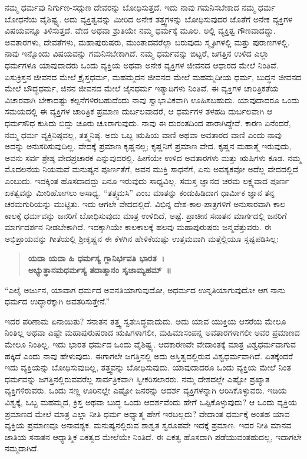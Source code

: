 ನಮ್ಮ ಧರ್ಮವು ನಿರ್ಗುಣ-ಸದ್ಗುಣ ದೇವರನ್ನು ಬೋಧಿಸುತ್ತದೆ. ಇದು ನಾವು ಗಮನಿಸಬೇಕಾದ ನಮ್ಮ ಧರ್ಮ ಬೋಧನೆಯ ವೈಶಿಷ್ಟ್ಯ. ಅದು ವ್ಯಕ್ತಿತ್ವವನ್ನು ಮೀರಿದ ಅನೇಕ ತತ್ತ್ವಗಳನ್ನು ಬೋಧಿಸುವುದರ ಜೊತೆಗೆ ಅನೇಕ ವ್ಯಕ್ತಿಗಳ ವಿಷಯವನ್ನೂ ತಿಳಿಸುತ್ತದೆ. ವೇದ ಅಥವಾ ಶ್ರುತಿಯೇ ನಮ್ಮ ಧರ್ಮಕ್ಕೆ ಮೂಲ. ಅಲ್ಲಿ ವ್ಯಕ್ತಿತ್ವ ಗೌಣವಾದದ್ದು. ಅವತಾರಗಳು, ದೇವತೆಗಳು, ಮಹಾಪುರುಷರು, ಮುಂತಾದವರೆಲ್ಲಾ ಬರುವುದು ಸ್ಮೃತಿಗಳಲ್ಲಿ ಮತ್ತು ಪುರಾಣಗಳಲ್ಲಿ. ನಾವು ಇನ್ನೊಂದು ವಿಷಯವನ್ನು ಗಮನಿಸಬೇಕಾಗಿದೆ. ನಮ್ಮ ಧರ್ಮವನ್ನು ಬಿಟ್ಟರೆ, ಜಗತ್ತಿನ ಉಳಿದ ಎಲ್ಲಾ ಧರ್ಮಗಳೂ ಯಾವುದಾದರು ಒಂದು ವ್ಯಕ್ತಿಯ ಅಥವಾ ಅನೇಕ ವ್ಯಕ್ತಿಗಳ ಜೀವನದ ಆಧಾರದ ಮೇಲೆ ನಿಂತಿವೆ. ಏಸುಕ್ರಿಸ್ತನ ಜೀವನದ ಮೇಲೆ ಕ್ರೈಸ್ತಧರ್ಮ, ಮಹಮ್ಮದನ ಜೀವನದ ಮೇಲೆ ಮಹಮ್ಮದೀಯ ಧರ್ಮ, ಬುದ್ಧನ ಜೀವನದ ಮೇಲೆ ಬೌದ್ಧಧರ್ಮ, ಜಿನನ ಜೀವನದ ಮೇಲೆ ಜೈನಧರ್ಮ ಇತ್ಯಾದಿಗಳು ನಿಂತಿವೆ. ಈ ವ್ಯಕ್ತಿಗಳ ಚಾರಿತ್ರಿಕತೆಯ ವಿಚಾರವಾಗಿ ಬೇಕಾದಷ್ಟು ಕಲ್ಪನೆಗಳಿರಬಹುದೆಂದು ನಾವು ಸ್ವಾಭಾವಿಕವಾಗಿ ಊಹಿಸಬಹುದು. ಯಾವುದಾದರೂ ಒಂದು ಸಮಯದಲ್ಲಿ ಈ ವ್ಯಕ್ತಿಗಳ ಚಾರಿತ್ರಿಕ ಪ್ರಮಾಣ ದುರ್ಬಲವಾದರೆ, ಆ ಧರ್ಮಗಳ ತಳಹದಿ ದುರ್ಬಲವಾಗಿ ಆ ಧರ್ಮಸೌಧ ಕುಸಿದು ಬಿದ್ದು ಚೂರು ಚೂರಾಗುವುದು. ನಾವು ಈ ದುರಂತದಿಂದ ಪಾರಾಗಿದ್ದೇವೆ. ಕಾರಣ ಏನೆಂದರೆ, ನಮ್ಮ ಧರ್ಮ ವ್ಯಕ್ತಿನಿಷ್ಠವಲ್ಲ, ತತ್ತ್ವನಿಷ್ಠ. ಅದು ಒಬ್ಬ ಋಷಿಯ ವಾಣಿ ಅಥವಾ ಅವತಾರದ ವಾಣಿ ಎಂದು ನಾವು ಅದನ್ನು ಅನುಸರಿಸುವುದಿಲ್ಲ. ವೇದಕ್ಕೆ ಪ್ರಮಾಣ ಕೃಷ್ಣನಲ್ಲ; ಕೃಷ್ಣನಿಗೆ ಪ್ರಮಾಣ ವೇದ. ಕೃಷ್ಣನ ಮಹಾತ್ಮೆ ಇರುವುದು, ಅವನು ಸರ್ವ ಶ್ರೇಷ್ಠ ವೇದಪ್ರಚಾರಕ ಎನ್ನುವುದರಲ್ಲಿ. ಹೀಗೆಯೇ ಉಳಿದ ಅವತಾರಗಳು ಮತ್ತು ಋಷಿಗಳು ಕೂಡ. ನಮ್ಮ ಮೊದಲನೆಯ ನಿಯಮವೆ ಮನುಷ್ಯನ ಪೂರ್ಣತೆಗೆ, ಅವನ ಮುಕ್ತಿ ಸಾಧನೆಗೆ, ಏನು ಅವಶ್ಯಕವೋ ಅದೆಲ್ಲ ವೇದದಲ್ಲಿದೆ ಎಂಬುದು. ಇದಕ್ಕಿಂತ ಹೊಸದಾದದ್ದು ಏನೂ ಇರುವುದು ಸಾಧ್ಯವಿಲ್ಲ. ಸಮಸ್ತ ಜ್ಞಾನದ ಚರಮ ಲಕ್ಷ್ಯವಾದ ಪೂರ್ಣ ಏಕತ್ವವನ್ನು ಮೀರಿಹೋಗಲು ಅಸಾಧ್ಯ. “ತತ್ತ್ವಮಸಿ” ಎಂಬ ಮಾತನ್ನು ಕಂಡುಹಿಡಿದಾಗ ಧಾರ್ಮಿಕ ಜ್ಞಾನ ತನ್ನ ಚರಮಗುರಿಯನ್ನು ಮುಟ್ಟಿತು. ಇದು ಆಗಲೇ ವೇದದಲ್ಲಿದೆ. ವಿಭಿನ್ನ ದೇಶ-ಕಾಲ-ಪಾತ್ರಗಳಿಗೆ ಅನುಸಾರವಾಗಿ ಕಾಲ ಕಾಲಕ್ಕೆ ಧರ್ಮವನ್ನು ಜನರಿಗೆ ಬೋಧಿಸುವುದು ಮಾತ್ರ ಉಳಿದಿದೆ, ಅಷ್ಟೆ. ಪ್ರಾಚೀನ ಸನಾತನ ಮಾರ್ಗದಲ್ಲಿ ಜನರಿಗೆ ಮಾರ್ಗದರ್ಶನ ನೀಡಬೇಕಾಗಿದೆ. ಇದಕ್ಕಾಗಿಯೇ ಕಾಲಕಾಲಕ್ಕೆ ಹಲವು ಮಹಾಪುರುಷರು ಜನ್ಮವೆತ್ತುವರು. ಈ ಅಭಿಪ್ರಾಯವನ್ನು ಗೀತೆಯಲ್ಲಿ ಶ‍್ರೀಕೃಷ್ಣನ ಈ ಕೆಳಗಿನ ಹೇಳಿಕೆಯಷ್ಟು ಉತ್ತಮವಾಗಿ ಮತ್ತೆಲ್ಲಿಯೂ ಸ್ಪಷ್ಟಪಡಿಸಿಲ್ಲ:

\begin{verse}
\textbf{ಯದಾ ಯದಾ ಹಿ ಧರ್ಮಸ್ಯ ಗ್ಲಾನಿರ್ಭವತಿ ಭಾರತ~।}\\\textbf{ಅಭ್ಯುತ್ಥಾನಮಧರ್ಮಸ್ಯ ತದಾತ್ಮಾನಂ ಸೃಜಾಮ್ಯಹಮ್​~॥}
\end{verse}

\vskip   -0.5cm

“ಎಲೈ ಅರ್ಜುನ, ಯಾವಾಗ ಧರ್ಮದ ಅವನತಿಯಾಗುವುದೋ, ಅಧರ್ಮದ ಉನ್ನತಿಯಾಗುವುದೋ ಆಗ ನಾನು ಧರ್ಮದ ಉದ್ಧಾರಕ್ಕಾಗಿ ಅವತರಿಸುತ್ತೇನೆ.”

ಇದರ ಪರಿಣಾಮ ಏನಾಯಿತು? ಸನಾತನ ತತ್ತ್ವ ಸ್ವತಃಸಿದ್ಧವಾದುದು. ಅದು ಯಾವ ಯುಕ್ತಿಯ ಆಸರೆಯ ಮೇಲೂ ನಿಂತಿಲ್ಲ ಅಥವಾ ಎಷ್ಟೇ ಮಹಾಪುರುಷರಾದ ಋಷಿಗಳಾಗಲೀ, ಮಹಿಮಾಸಂಪನ್ನ ಅವತಾರಗಳಾಗಲೀ ಅವರ ಪ್ರಮಾಣದ ಮೇಲೂ ನಿಂತಿಲ್ಲ. ಇದು ಭಾರತ ಧರ್ಮದ ಒಂದು ವೈಶಿಷ್ಟ್ಯ. ಆದಕಾರಣವೇ ವೇದಾಂತಕ್ಕೆ ಮಾತ್ರ ವಿಶ್ವಧರ್ಮವಾಗುವ ಹಕ್ಕಿದೆ ಎಂದು ನಾವು ಹೇಳುವುದು. ಈಗಾಗಲೇ ಜಗತ್ತಿನಲ್ಲಿ ಅದು ಅಸ್ತಿತ್ವದಲ್ಲಿರುವ ವಿಶ್ವಧರ್ಮವಾಗಿದೆ. ಏತಕ್ಕೆಂದರೆ ಇದು ವ್ಯಕ್ತಿಯನ್ನು ಬೋಧಿಸುವುದಿಲ್ಲ, ತತ್ತ್ವವನ್ನು ಬೋಧಿಸುವುದು. ಯಾವುದಾದರೂ ಒಂದು ವ್ಯಕ್ತಿಯ ಮೇಲೆ ನಿಂತ ಧರ್ಮವನ್ನು ಜಗತ್ತಿನಲ್ಲಿರುವವರೆಲ್ಲ ಸಾರ್ವತ್ರಿಕವಾಗಿ ಸ್ವೀಕರಿಸಲಾರರು. ನಮ್ಮ ದೇಶದಲ್ಲೇ ಎಷ್ಟೋ ಪ್ರಖ್ಯಾತ ವ್ಯಕ್ತಿಗಳಿರುವರು. ಒಂದು ಸಣ್ಣ ಊರಿನಲ್ಲೇ ಎಷ್ಟೋ ಜನರನ್ನು ಆದರ್ಶ ವ್ಯಕ್ತಿಗಳನ್ನಾಗಿ ಆರಿಸಿಕೊಳ್ಳುವರು. ಇಡಿಯ ವಿಶ್ವಕ್ಕೆ, ಒಬ್ಬ ಮಹಮ್ಮದ, ಕ್ರಿಸ್ತ ಅಥವಾ ಬುದ್ಧ ಒಂದು ಆದರ್ಶವೆಂದು ಹೇಗೆ ಒಪ್ಪಿಕೊಳ್ಳುವುದು? ಆ ಒಂದು ವ್ಯಕ್ತಿಯ ಪ್ರಮಾಣದ ಮೇಲೆ ಮಾತ್ರ ಎಲ್ಲಾ ನೀತಿ ಧರ್ಮ ಅಧ್ಯಾತ್ಮ ಹೇಗೆ ಇರಬಲ್ಲದು? ವೇದಾಂತ ಧರ್ಮಕ್ಕೆ ಅಂತಹ ಯಾವ ವ್ಯಕ್ತಿಯ ಪ್ರಮಾಣವೂ ಅನಾವಶ್ಯಕ. ಮನುಷ್ಯನಲ್ಲಿರುವ ಶಾಶ್ವತ ಸ್ವರೂಪವೇ ಇದಕ್ಕೆ ಪ್ರಮಾಣ. ಇದರ ನೀತಿ ಮಾನವ ಜಾತಿಯ ಸನಾತನ ಆಧ್ಯಾತ್ಮಿಕ ಏಕತ್ವದ ಮೇಲೆಯೇ ನಿಂತಿದೆ. ಈ ಏಕತ್ವ ಹೊಸದಾಗಿ ಪಡೆಯುವಂತಹುದಲ್ಲ, ಇದಾಗಲೇ ನಮ್ಮದಾಗಿದೆ.

